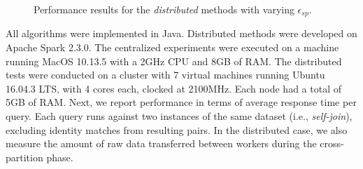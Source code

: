 



\begin{figure}[!t]
 \centering
 \caption{Performance results for the {\em distributed} methods with varying $\epsilon_{sp}$.}
 \label{exp:distr_EpsSP}
\end{figure}





All algorithms were implemented in Java. Distributed methods were developed on Apache Spark 2.3.0. The centralized experiments were executed on a machine running MacOS 10.13.5 with a 2GHz CPU and 8GB of RAM. The distributed tests were conducted on a cluster with 7 virtual machines running Ubuntu 16.04.3 LTS, with 4 cores each, clocked at 2100MHz. Each node had a total of 5GB of RAM. Next, we report performance in terms of average response time per query. Each query runs against two instances of the same dataset (i.e., {\em self-join}), excluding identity matches from resulting pairs. In the distributed case, we also measure the amount of raw data transferred between workers during the cross-partition phase. 


